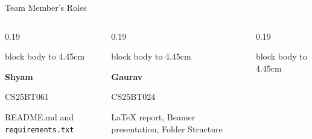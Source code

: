\documentclass[aspectratio=169,11pt]{beamer}
\begin{document}
\begin{frame}{Team Member's Roles}
\begin{columns}[T,onlytextwidth]
\begin{column}{0.19\textwidth}
\begin{beamercolorbox}[
  wd=\linewidth,
  ht=4.65cm,
  dp=0cm,
  center,
  sep=0.08cm
]{block body}
\vbox to 4.45cm{
\centering
\vspace{0.05cm}


\vspace{0.15cm}
{\bfseries Shyam}

\vspace{0.08cm}
{\scriptsize CS25BT061}

\vspace{0.25cm}
\parbox[t][1.65cm][t]{\linewidth}{
\centering\scriptsize
README.md and
\texttt{requirements.txt}
}
\vfill
}
\end{beamercolorbox}
\end{column}


\begin{column}{0.19\textwidth}
\begin{beamercolorbox}[
  wd=\linewidth,
  ht=4.65cm,
  dp=0cm,
  center,
  sep=0.08cm
]{block body}
\vbox to 4.45cm{
\centering
\vspace{0.05cm}


\vspace{0.15cm}
{\bfseries Gaurav}

\vspace{0.08cm}
{\scriptsize CS25BT024}

\vspace{0.25cm}
\parbox[t][1.65cm][t]{\linewidth}{
\centering\scriptsize
LaTeX report, Beamer presentation,
Folder Structure
}
\vfill
}
\end{beamercolorbox}
\end{column}


\begin{column}{0.19\textwidth}
\begin{beamercolorbox}[
  wd=\linewidth,
  ht=4.65cm,
  dp=0cm,
  center,
  sep=0.08cm
]{block body}
\vbox to 4.45cm{
\centering
\vspace{0.05cm}

}
\end{beamercolorbox}
\end{column}
\end{columns}
\end{frame}
\end{document}
